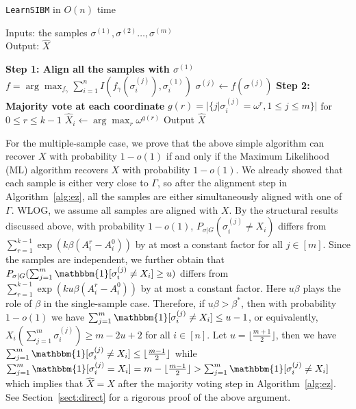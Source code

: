 \documentclass[conference]{IEEEtran}
\begin{document}
\begin{center}
	\begin{minipage}{.55\textwidth}
		\begin{algorithm}[H]
			\caption{\texttt{LearnSIBM} in $O(n)$ time} \label{alg:ez}
			Inputs: the samples $\sigma^{(1)},\sigma^{(2)}\dots,\sigma^{(m)}$ \\
			Output: $\hat{X}$
			\begin{algorithmic}[1]
				\Statex \hspace*{-0.3in} 
				{\bf Step 1: Align all the samples with $\sigma^{(1)}$ }
				\State $f=\arg\max_{f_{\gamma}} \sum_{i=1}^n I(f_{\gamma}(\sigma^{(j)}_i), \sigma^{(1)}_i)$
				\State $\sigma^{(j)} \gets f(\sigma^{(j)})$
				\EndFor
				\Statex \hspace*{-0.3in}
				{\bf Step 2: Majority vote at each coordinate}
				\State $g(r) = |\{j | \sigma^{(j)}_i = \omega^r,1\leq j \leq m\}|$ for $ 0 \leq r \leq k-1$
				\State $\hat{X}_i \gets  \arg\max_r \omega^{g(r)}$
				\State {}
				\EndFor
				\State Output $\hat{X}$
			\end{algorithmic}
		\end{algorithm}
	\end{minipage}
\end{center}
For the multiple-sample case, we prove that the above simple algorithm can recover $X$ with probability $1-o(1)$ if and only if the Maximum Likelihood (ML) algorithm recovers $X$ with probability $1-o(1)$. We already showed that each sample is either very close to $\Gamma$, so after the alignment step in Algorithm~\ref{alg:ez}, all the samples are either simultaneously aligned with one of $\Gamma$. WLOG, we assume all samples are aligned with $X$.
By the structural results discussed above, with probability $1-o(1)$, $P_{\sigma|G}(\sigma_i^{(j)} \neq X_i)$ differs from $\sum_{r=1}^{k-1} \exp (k \beta (A^r_i-A^0_i))$ by at most a constant factor for all $j\in[m]$. Since the samples are independent, we further obtain that $P_{\sigma|G}(\sum_{j=1}^m\mathbbm{1}[\sigma_i^{(j)} \neq X_i]\ge u)$ differs from $\sum_{r=1}^{k-1} \exp (k u \beta (A^r_i-A^0_i))$
by at most a constant factor.
Here $u\beta$ plays the role of $\beta$ in the single-sample case.
Therefore, if $u\beta>\beta^\ast$, then with probability $1-o(1)$ we have $\sum_{j=1}^m\mathbbm{1}[\sigma_i^{(j)} \neq X_i] \le u-1$, or equivalently, $X_i(\sum_{j=1}^m \sigma_i^{(j)} ) \ge m-2u+2$ for all $i\in[n]$. Let $u=\lfloor \frac{m+1}{2} \rfloor$,
then we have $\sum_{j=1}^m\mathbbm{1}[\sigma_i^{(j)} \neq X_i] \le \lfloor \frac{m-1}{2} \rfloor $ while $\sum_{j=1}^m\mathbbm{1}[\sigma_i^{(j)} = X_i]
= m - \lfloor \frac{m-1}{2} \rfloor > \sum_{j=1}^m\mathbbm{1}[\sigma_i^{(j)} \neq X_i] $
which implies that $\hat{X}=X$ after the majority voting step in Algorithm~\ref{alg:ez}. See Section~\ref{sect:direct} for a rigorous proof of the above argument.
\end{document}
